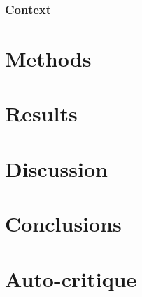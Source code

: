 \documentclass[pdftex,12pt,a4paper]{report}
\begin{document}
\subsection{Context}


\chapter{Methods}


\chapter{Results}

\chapter{Discussion}

\chapter{Conclusions}

\chapter*{Auto-critique}

\printbibliography[title={References}]


\end{document}

